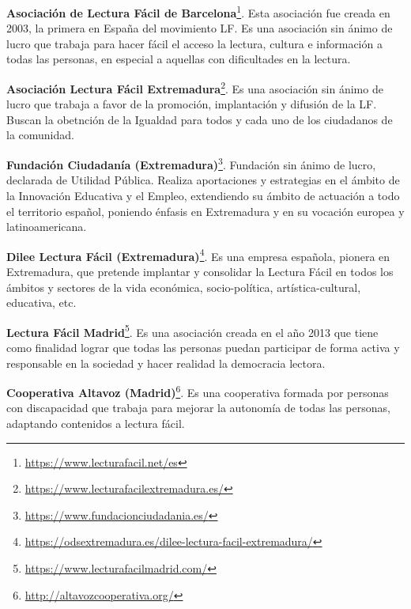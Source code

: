 \begin{itemize}
	\item{\textbf{Asociación de Lectura Fácil de Barcelona}\footnote{\href{https://www.lecturafacil.net/es}{{https://www.lecturafacil.net/es}}}. Esta asociación fue creada en 2003, la primera en España del movimiento LF. Es una asociación sin ánimo de lucro que trabaja para hacer fácil el acceso la lectura, cultura e información a todas las personas, en especial a aquellas con dificultades en la lectura. 
	
	\item{\textbf{Asociación Lectura Fácil Extremadura}\footnote{\href{https://www.lecturafacilextremadura.es/}{{https://www.lecturafacilextremadura.es/}}}. Es una asociación sin ánimo de lucro que trabaja a favor de la promoción, implantación y difusión de la LF. Buscan la obetnción de la Igualdad para todos y cada uno de los ciudadanos de la comunidad.
	
	\item{\textbf{Fundación Ciudadanía (Extremadura)}\footnote{\href{https://www.fundacionciudadania.es/}{https://www.fundacionciudadania.es/}}}. Fundación sin ánimo de lucro, declarada de Utilidad Pública. Realiza aportaciones y estrategias en el ámbito de la Innovación Educativa y el Empleo, extendiendo su ámbito de actuación a todo el territorio español, poniendo énfasis en Extremadura y en su vocación europea y latinoamericana.
	
	\item{\textbf{Dilee Lectura Fácil (Extremadura)}\footnote{\href{https://odsextremadura.es/dilee-lectura-facil-extremadura/}{https://odsextremadura.es/dilee-lectura-facil-extremadura/}}}. Es una empresa española, pionera en Extremadura, que pretende implantar y consolidar la Lectura Fácil en todos los ámbitos y sectores de la vida económica, socio-política, artística-cultural, educativa, etc.
	
	\item{\textbf{Lectura Fácil Madrid}\footnote{\href{https://www.lecturafacilmadrid.com/}{https://www.lecturafacilmadrid.com/}}}. Es una asociación creada en el año 2013 que tiene como finalidad  lograr que todas las personas puedan participar de forma activa y responsable en la sociedad y hacer realidad la democracia lectora. 
	
	\item{\textbf{Cooperativa Altavoz (Madrid)}\footnote{\href{http://altavozcooperativa.org/}{http://altavozcooperativa.org/}}}. Es una cooperativa formada por personas con discapacidad
	que trabaja para mejorar la autonomía de todas las personas, adaptando contenidos a lectura fácil.
	
}}
\end{itemize}
